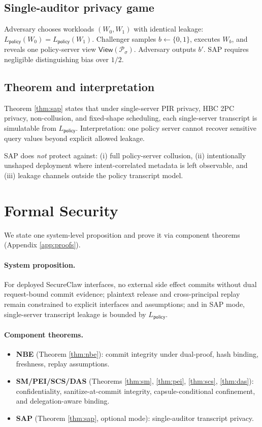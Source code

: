 \subsection{Single-auditor privacy game}

Adversary chooses workloads $(W_0,W_1)$ with identical leakage:
$L_{\mathsf{policy}}(W_0)=L_{\mathsf{policy}}(W_1)$.
Challenger samples $b\leftarrow\{0,1\}$, executes $W_b$, and reveals one policy-server view $\mathsf{View}(\mathcal{P}_\sigma)$.
Adversary outputs $b'$.
SAP requires negligible distinguishing bias over $1/2$.

\subsection{Theorem and interpretation}

Theorem \ref{thm:sap} states that under single-server PIR privacy, HBC 2PC privacy, non-collusion, and fixed-shape scheduling, each single-server transcript is simulatable from $L_{\mathsf{policy}}$.
Interpretation: one policy server cannot recover sensitive query values beyond explicit allowed leakage.

SAP does \emph{not} protect against:
(i) full policy-server collusion,
(ii) intentionally unshaped deployment where intent-correlated metadata is left observable,
and (iii) leakage channels outside the policy transcript model.

\section{Formal Security}
\label{sec:formal}

We state one system-level proposition and prove it via component theorems (Appendix \ref{app:proofs}).

\paragraph{System proposition.}
For deployed SecureClaw interfaces, no external side effect commits without dual request-bound commit evidence; plaintext release and cross-principal replay remain constrained to explicit interfaces and assumptions; and in SAP mode, single-server transcript leakage is bounded by $L_{\mathsf{policy}}$.

\paragraph{Component theorems.}
\begin{itemize}
  \item \textbf{NBE} (Theorem \ref{thm:nbe}): commit integrity under dual-proof, hash binding, freshness, replay assumptions.
  \item \textbf{SM/PEI/SCS/DAS} (Theorems \ref{thm:sm}, \ref{thm:pei}, \ref{thm:scs}, \ref{thm:das}): confidentiality, sanitize-at-commit integrity, capsule-conditional confinement, and delegation-aware binding.
  \item \textbf{SAP} (Theorem \ref{thm:sap}, optional mode): single-auditor transcript privacy.
\end{itemize}

